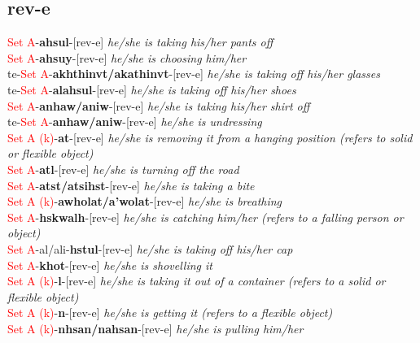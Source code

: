 \documentclass[oneside,openany]{book}%
\begin{document}
\subsection*{rev-e}%
\textcolor{Red}{Set A}{-}\textbf{ahsul}{-}[rev-e] \textit{ he/she is taking his/her pants off} \\%
\textcolor{Red}{Set A}{-}\textbf{ahsuy}{-}[rev-e] \textit{ he/she is choosing him/her} \\%
te{-}\textcolor{Red}{Set A}{-}\textbf{akhthinvt/akathinvt}{-}[rev-e] \textit{ he/she is taking off his/her glasses} \\%
te{-}\textcolor{Red}{Set A}{-}\textbf{alahsul}{-}[rev-e] \textit{ he/she is taking off his/her shoes} \\%
\textcolor{Red}{Set A}{-}\textbf{anhaw/aniw}{-}[rev-e] \textit{ he/she is taking his/her shirt off} \\%
te{-}\textcolor{Red}{Set A}{-}\textbf{anhaw/aniw}{-}[rev-e] \textit{ he/she is undressing} \\%
\textcolor{Red}{Set A (k)}{-}\textbf{at}{-}[rev-e] \textit{ he/she is removing it from a hanging position (refers to solid or flexible object)} \\%
\textcolor{Red}{Set A}{-}\textbf{atl}{-}[rev-e] \textit{ he/she is turning off the road} \\%
\textcolor{Red}{Set A}{-}\textbf{atst/atsihst}{-}[rev-e] \textit{ he/she is taking a bite} \\%
\textcolor{Red}{Set A (k)}{-}\textbf{awholat/a'wolat}{-}[rev-e] \textit{ he/she is breathing} \\%
\textcolor{Red}{Set A}{-}\textbf{hskwalh}{-}[rev-e] \textit{ he/she is catching him/her (refers to a falling person or object)} \\%
\textcolor{Red}{Set A}{-}al/ali{-}\textbf{hstul}{-}[rev-e] \textit{ he/she is taking off his/her cap} \\%
\textcolor{Red}{Set A}{-}\textbf{khot}{-}[rev-e] \textit{ he/she is shovelling it} \\%
\textcolor{Red}{Set A (k)}{-}\textbf{l}{-}[rev-e] \textit{ he/she is taking it out of a container (refers to a solid or flexible object)} \\%
\textcolor{Red}{Set A (k)}{-}\textbf{n}{-}[rev-e] \textit{ he/she is getting it (refers to a flexible object)} \\%
\textcolor{Red}{Set A (k)}{-}\textbf{nhsan/nahsan}{-}[rev-e] \textit{ he/she is pulling him/her} \\%
\end{document}

